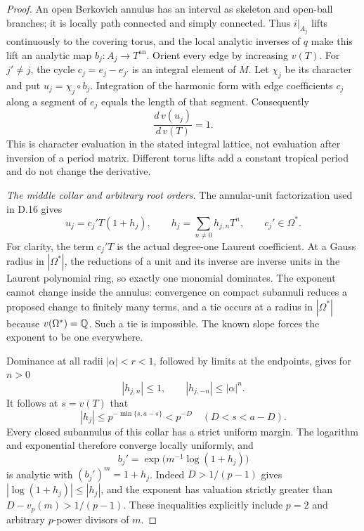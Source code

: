 \begin{proof}
An open Berkovich annulus has an interval as skeleton and
open-ball branches; it is locally path connected and simply
connected. Thus $i|_{A_j}$ lifts continuously to the covering
torus, and the local analytic inverses of $q$ make this lift
an analytic map $b_j:A_j\to T^{\mathrm{an}}$.
Orient every edge by increasing $v(T)$. For $j'\ne j$, the
cycle $c_j=e_j-e_{j'}$ is an integral element of $M$.
Let $\chi_j$ be its character and put $u_j=\chi_j\circ b_j$.
Integration of the harmonic form with edge coefficients $c_j$
along a segment of $e_j$ equals the length of that segment.
Consequently
\[
                       \frac{d\,v(u_j)}{d\,v(T)}=1.
\]
This is character evaluation in the stated integral lattice,
not evaluation after inversion of a period matrix. Different
torus lifts add a constant tropical period and do not change
the derivative.

\emph{The middle collar and arbitrary root orders.}
The annular-unit factorization used in D.16 gives
\[
       u_j=c_j'T(1+h_j),\qquad
       h_j=\sum_{n\ne0}h_{j,n}T^n,\qquad c_j'\in\Omega^*.
\]
For clarity, the term $c_j'T$ is the actual degree-one Laurent
coefficient. At a Gauss radius in $|\Omega^*|$, the reductions
of a unit and its inverse are inverse units in the Laurent
polynomial ring, so exactly one monomial dominates.
The exponent cannot change inside the annulus: convergence
on compact subannuli reduces a proposed change to finitely
many terms, and a tie occurs at a radius in $|\Omega^*|$
because $v(\Omega^*)=\mathbb Q$. Such a tie is impossible.
The known slope forces the exponent to be one everywhere.

Dominance at all radii $|\alpha|<r<1$, followed by limits
at the endpoints, gives for $n>0$
\[
                         |h_{j,n}|\le1,
                   \qquad |h_{j,-n}|\le|\alpha|^n.
\]
It follows at $s=v(T)$ that
\begin{equation}\label{eq:D17:middle-bound}
 |h_j|\le p^{-\min\{s,a-s\}}<p^{-D}
                      \quad(D<s<a-D).
\end{equation}
Every closed subannulus of this collar has a strict uniform
margin. The logarithm and exponential therefore converge
locally uniformly, and
\[
                b_j'=\exp\bigl(m^{-1}\log(1+h_j)\bigr)
\]
is analytic with $(b_j')^m=1+h_j$.
Indeed $D>1/(p-1)$ gives
$|\log(1+h_j)|\le|h_j|$, and the exponent has valuation
strictly greater than $D-v_p(m)>1/(p-1)$.
These inequalities explicitly include $p=2$ and arbitrary
$p$-power divisors of $m$.


\end{proof}
